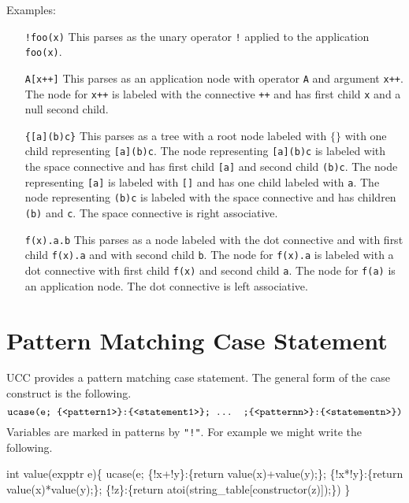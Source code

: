 \documentclass{article}
\newcommand{\mtt}[1]{\mbox{\tt #1}}
\begin{document}
\noindent Examples:

\begin{enumerate}

\item[\mtt{!foo(x)}] This parses as the unary operator \mtt{!} applied to the application \mtt{foo(x)}.

\item[\mtt{A[x++]}] This parses as an application node with operator \mtt{A} and argument \mtt{x++}.  The node for \mtt{x++}
is labeled with the connective \mtt{++} and has first child \mtt{x} and a null second
child.

\item[\mtt{\{[a](b)c\}}] This parses as a tree with a root node labeled with $\{\}$ with one child representing \mtt{[a](b)c}.  The node representing
\mtt{[a](b)c} is labeled with the space connective and has first child \mtt{[a]} and second child \mtt{(b)c}.  The node representing \mtt{[a]}
is labeled with \mtt{[]} and has one child labeled with \mtt{a}.
The node representing \mtt{(b)c} is labeled with the space connective and has children \mtt{(b)} and \mtt{c}.  The space connective is right associative.

\item[\mtt{f(x).a.b}] This parses as a node labeled with the dot connective and with first child \mtt{f(x).a} and with second child \mtt{b}.
The node for \mtt{f(x).a} is labeled with a dot connective with first child \mtt{f(x)} and second child \mtt{a}.  The node for \mtt{f(a)} is an application node.
The dot connective is left associative.
\end{enumerate}

\section{Pattern Matching Case Statement}

UCC provides a pattern matching case statement.
The general form of the case construct is the following.
$$\mtt{ucase(e; \{<pattern1>\}:\{<statement1>\}; ... ;\{<patternn>\}:\{<statementn>\})}$$
Variables are marked in patterns by \mtt{"!"}. For example we might write the following.

\begin{code}
int value(expptr e)\{
  ucase(e;
   \{!x+!y\}:\{return value(x)+value(y);\};
   \{!x*!y\}:\{return value(x)*value(y);\};
   \{!z\}:\{return atoi(string\_table[constructor(z)]);\})
\}
\end{code}
\end{document}
